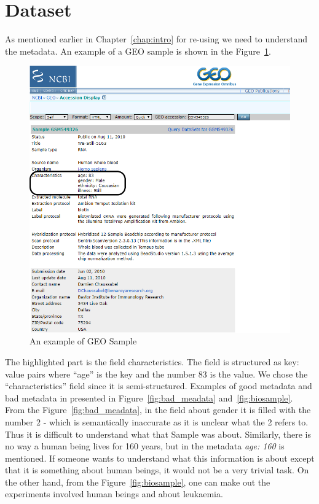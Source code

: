 


\section{Dataset}\label{section:data}
As mentioned earlier in Chapter~\ref{chap:intro} for re-using we need to understand the metadata. 
An example of a GEO sample is shown in the Figure~\ref{figure: sample}. 
\begin{figure}[h!]
\centering
\includegraphics[scale=0.5]{Figures/sample.png}
\caption{An example of GEO Sample}
\label{figure: sample}
\end{figure}
The highlighted part is the field characteristics. The field is structured as key: value pairs where ``age'' is the key and the number $83$ is the value. We chose the ``characteristics'' field since it is semi-structured.
Examples of good metadata and bad metadata in presented in Figure~\ref{fig:bad_meadata} and~\ref{fig:biosample}. From the Figure~\ref{fig:bad_meadata}, in the field about gender it is filled with the number $2$ - which is semantically inaccurate as it is unclear what the 2 refers to. Thus it is difficult to understand what that Sample was about. Similarly, there is no way a human being lives for 160 years, but in the metadata \emph{age: 160} is mentioned. If someone wants to understand what this information is about except that it is something about human beings, it would not be a very trivial task. On the other hand, from the Figure~\ref{fig:biosample}, one can make out the experiments involved human beings and about leukaemia.

